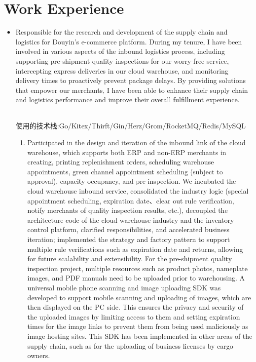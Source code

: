 \documentclass{resume}
\newcommand{\en}[1]{#1}
\newcommand{\zh}[1]{}
\begin{document}
\section{\en{Work Experience}\zh{工作经历}}
\en{}
\zh{\datedsubsection{\textbf{\href{https://www.bytedance.com/}{字节跳动科技有限公司，北京}}}{2021/04 -- 至今}}
\en{}
\zh{\role{抖音电商供应链与物流}{后端开发工程师}}
\begin{itemize}
   		\item \en{Responsible for the research and development of the supply chain and logistics for Douyin's e-commerce platform. During my tenure, I have been involved in various aspects of the inbound logistics process, including supporting pre-shipment quality inspections for our worry-free service, intercepting express deliveries in our cloud warehouse, and monitoring delivery times to proactively prevent package delays. By providing solutions that empower our merchants, I have been able to enhance their supply chain and logistics performance and improve their overall fulfillment experience.}
           	 \zh{负责抖音电商下供应链与物流的研发。期间参与云仓inbound入库链路、支持无忧服务的前置质检、云仓发货快递拦截、商家发货包裹超时预警监控等，提供解决方案赋能商家，提升商家供应链与物流的履约体验。}
          \\使用的技术栈:Go/Kitex/Thirft/Gin/Herz/Grom/RocketMQ/Redis/MySQL\\
          \begin{enumerate}
             \item \en{Participated in the design and iteration of the inbound link of the cloud warehouse, which supports both ERP and non-ERP merchants in creating, printing replenishment orders, scheduling warehouse appointments, green channel appointment scheduling (subject to approval), capacity occupancy, and pre-inspection. We incubated the cloud warehouse inbound service, consolidated the industry logic (special appointment scheduling, expiration date、clear out rule verification, notify merchants of quality inspection results, etc.), decoupled the architecture code of the cloud warehouse industry and the inventory control platform, clarified responsibilities, and accelerated business iteration; implemented the strategy and factory pattern to support multiple rule verifications such as expiration date and returns, allowing for future scalability and extensibility. For the pre-shipment quality inspection project, multiple resources such as product photos, nameplate images, and PDF manuals need to be uploaded prior to warehousing. A universal mobile phone scanning and image uploading SDK was developed to support mobile scanning and uploading of images, which are then displayed on the PC side. This ensures the privacy and security of the uploaded images by limiting access to them and setting expiration times for the image links to prevent them from being used maliciously as image hosting sites. This SDK has been implemented in other areas of the supply chain, such as for the uploading of business licenses by cargo owners.}

\end{enumerate}
\end{itemize}
\end{document}
